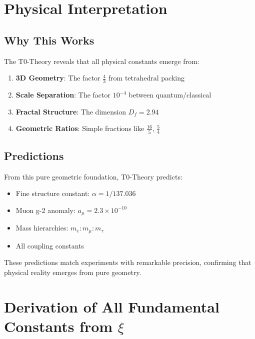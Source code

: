\documentclass[12pt,a4paper]{article}
\newcommand{\xipar}{\xi}  %
\begin{document}
	\section{Physical Interpretation}
	
	\subsection{Why This Works}
	
	The T0-Theory reveals that all physical constants emerge from:
	
	\begin{enumerate}
		\item \textbf{3D Geometry}: The factor $\frac{4}{3}$ from tetrahedral packing
		\item \textbf{Scale Separation}: The factor $10^{-4}$ between quantum/classical
		\item \textbf{Fractal Structure}: The dimension $D_f = 2.94$
		\item \textbf{Geometric Ratios}: Simple fractions like $\frac{16}{5}$, $\frac{5}{4}$
	\end{enumerate}
	
	\subsection{Predictions}
	
	From this pure geometric foundation, T0-Theory predicts:
	
	\begin{itemize}
		\item Fine structure constant: $\alpha = 1/137.036$
		\item Muon g-2 anomaly: $a_\mu = 2.3 \times 10^{-10}$
		\item Mass hierarchies: $m_e : m_\mu : m_\tau$
		\item All coupling constants
	\end{itemize}
	
	These predictions match experiments with remarkable precision, confirming that physical reality emerges from pure geometry.
	
	\section{Derivation of All Fundamental Constants from $\xipar$}
	
\end{document}
